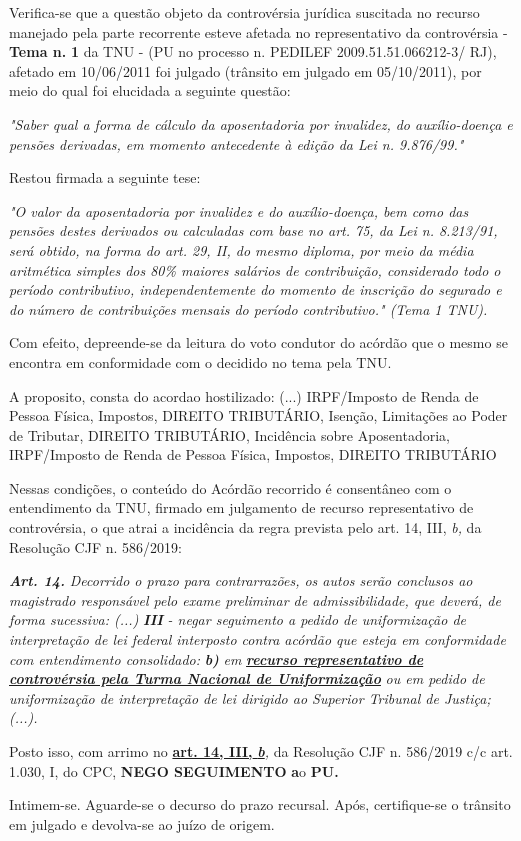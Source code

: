 \documentclass[12pt]{article}
\begin{document}
\justifying
\noindent Verifica-se que a questão objeto da controvérsia jurídica suscitada no recurso manejado pela parte recorrente esteve afetada no representativo da controvérsia - \textbf{Tema n. }\textbf{1} da TNU - (PU no processo n. PEDILEF 2009.51.51.066212-3/ RJ),  afetado em 10/06/2011 foi julgado (trânsito em julgado em 05/10/2011), por meio do qual foi elucidada a seguinte questão:

\noindent \textit{"Saber qual a forma de cálculo da aposentadoria por invalidez, do auxílio-doença e pensões derivadas, em momento antecedente à edição da Lei n. 9.876/99."}

\noindent Restou firmada a seguinte tese:

\noindent \textit{"O valor da aposentadoria por invalidez e do auxílio-doença, bem como das pensões destes derivados ou calculadas com base no art. 75, da Lei n. 8.213/91, será obtido, na forma do art. 29, II, do mesmo diploma, por meio da média aritmética simples dos 80\% maiores salários de contribuição, considerado todo o período contributivo, independentemente do momento de inscrição do segurado e do número de contribuições mensais do período contributivo." (Tema 1 TNU).}

\noindent Com efeito, depreende-se da leitura do voto condutor do acórdão que o mesmo se encontra em conformidade com o decidido no  tema pela TNU.

\noindent A proposito, consta do acordao hostilizado: (...) IRPF/Imposto de Renda de Pessoa Física, Impostos, DIREITO TRIBUTÁRIO, Isenção, Limitações ao Poder de Tributar, DIREITO TRIBUTÁRIO, Incidência sobre Aposentadoria, IRPF/Imposto de Renda de Pessoa Física, Impostos, DIREITO TRIBUTÁRIO

\noindent Nessas condições, o conteúdo do Acórdão recorrido é consentâneo com o entendimento da TNU, firmado em julgamento de recurso representativo de controvérsia, o que atrai a incidência da regra prevista pelo art. 14, III, \textit{b,} da Resolução CJF n. 586/2019:

\noindent \textit{\textbf{Art. 14.}}\textit{ Decorrido o prazo para contrarrazões, os autos serão conclusos ao magistrado responsável pelo exame preliminar de admissibilidade, que deverá, de forma sucessiva: (...) }\textit{\textbf{III }}\textit{- negar seguimento a pedido de uniformização de interpretação de lei federal interposto contra acórdão que esteja em conformidade com entendimento consolidado: }\textit{\textbf{b)}}\textit{ em }\uline{\textit{\textbf{recurso representativo de controvérsia pela Turma Nacional de Uniformização}}}\textit{ ou em pedido de uniformização de interpretação de lei dirigido ao Superior Tribunal de Justiça;(...).}

\noindent Posto isso, com arrimo no \uline{\textbf{art. 14, III, }}\uline{\textit{\textbf{b}}}\textit{,} da Resolução CJF n. 586/2019 c/c art. 1.030, I, do CPC, \textbf{NEGO SEGUIMENTO }\textbf{a}o\textbf{ PU}\textbf{.}

\noindent Intimem-se. Aguarde-se o decurso do prazo recursal. Após, certifique-se o trânsito em julgado e devolva-se ao juízo de origem.
\end{document}
